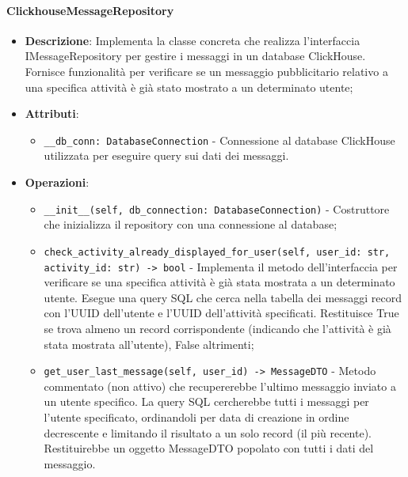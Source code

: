 \documentclass[10pt]{article}
\begin{document}
    \paragraph{ClickhouseMessageRepository}
    \begin{itemize} 
    \item \textbf{Descrizione}: Implementa la classe concreta che realizza l'interfaccia IMessageRepository per gestire i messaggi in un database ClickHouse. Fornisce funzionalità per verificare se un messaggio pubblicitario relativo a una specifica attività è già stato mostrato a un determinato utente;
    \item \textbf{Attributi}:
    \begin{itemize}
        \item \texttt{\_\_db\_conn: DatabaseConnection} - Connessione al database ClickHouse utilizzata per eseguire query sui dati dei messaggi.
    \end{itemize}
    
    \item \textbf{Operazioni}:
    \begin{itemize}
        \item \texttt{\_\_init\_\_(self, db\_connection: DatabaseConnection)} - Costruttore che inizializza il repository con una connessione al database;
        
        \item \texttt{check\_activity\_already\_displayed\_for\_user(self, user\_id: str, activity\_id: str) -> bool} - Implementa il metodo dell'interfaccia per verificare se una specifica attività è già stata mostrata a un determinato utente. Esegue una query SQL che cerca nella tabella dei messaggi record con l'UUID dell'utente e l'UUID dell'attività specificati. Restituisce True se trova almeno un record corrispondente (indicando che l'attività è già stata mostrata all'utente), False altrimenti;
        
        \item \texttt{get\_user\_last\_message(self, user\_id) -> MessageDTO} - Metodo commentato (non attivo) che recupererebbe l'ultimo messaggio inviato a un utente specifico. La query SQL cercherebbe tutti i messaggi per l'utente specificato, ordinandoli per data di creazione in ordine decrescente e limitando il risultato a un solo record (il più recente). Restituirebbe un oggetto MessageDTO popolato con tutti i dati del messaggio.
    \end{itemize}
    \end{itemize}
\end{document}
